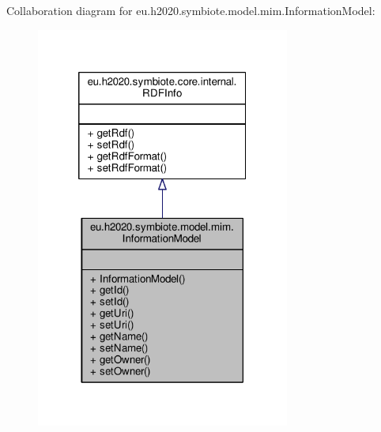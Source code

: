 Collaboration diagram for eu.\+h2020.\+symbiote.\+model.\+mim.\+Information\+Model\+:
\nopagebreak
\begin{figure}[H]
\begin{center}
\leavevmode
\includegraphics[width=236pt]{classeu_1_1h2020_1_1symbiote_1_1model_1_1mim_1_1InformationModel__coll__graph}
\end{center}
\end{figure}
